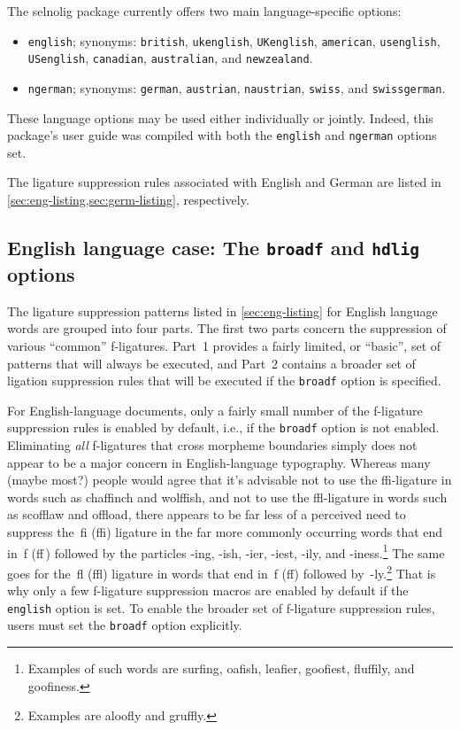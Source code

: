 \documentclass[11pt]{article}
\newcommand{\pkg}[1]{\textsf{#1}}
\newcommand{\opt}[1]{\texttt{#1}}
\begin{document}
The \pkg{selnolig} package currently offers two main language-specific options: 
\begin{itemize}
\item \opt{english}; synonyms: \opt{british}, \opt{ukenglish}, \opt{UKenglish}, \opt{amer\-ican}, \opt{usenglish}, \opt{USenglish}, \opt{cana\-dian}, \opt{australian}, and \opt{new\-zealand}.
\item \opt{ngerman}; synonyms: \opt{german}, \opt{austrian}, \opt{naustrian}, \opt{swiss}, and \opt{swiss\-german}.
\end{itemize}
These language options may be used either individually or jointly. Indeed, this package's user guide was compiled with both the \opt{english} and \opt{ngerman} options set.

The ligature suppression rules associated with English and German are listed in \cref{sec:eng-listing,sec:germ-listing}, respectively.



\subsection[English language case: The broadf and hdlig options]{English language case: The \opt{broadf} and \opt{hdlig} options} \label{sec:eng-opt}

The ligature suppression patterns listed in \cref{sec:eng-listing} for English language words are grouped into four parts. The first two parts concern the suppression of various \enquote{common} f-ligatures. Part~1 provides a fairly limited, or \enquote{basic}, set of patterns that will always be executed, and Part~2 contains a broader set of ligation suppression rules that will be executed if the \opt{broadf} option is specified. 

For English-language documents, only a fairly small number of the f-ligature suppression rules is enabled by default, i.e., if the \opt{broadf} option is not enabled. Eliminating \emph{all} f-ligatures that cross morpheme boundaries simply does not appear to be a major concern in English-language typography. Whereas many (maybe most?) people would agree that it's advisable not to use the ffi-ligature in words such as chaffinch and wolffish, and not to use the ffl-ligature in words such as scofflaw and offload, there appears to be far less of a perceived need to suppress the~fi (ffi) ligature in the far more commonly occurring words that end in~f (ff\,) followed by the particles -ing, -ish, -ier, -iest, -ily, and -iness.\footnote{Examples of such words are sur\mbox{fi}ng, oa\mbox{fi}sh, lea\mbox{fi}er, goo\mbox{fi}est, flu\mbox{ffi}ly, and goo\mbox{fi}ness.} The same goes for the~fl (ffl) ligature in words that end in~f (ff) followed by~-ly.\footnote{Examples are \mbox{aloofly} and \mbox{gruffly}.} That is why only a few f-ligature suppression macros are enabled by default if the \opt{english} option is set. To enable the broader set of f-ligature suppression rules, users must set the \opt{broadf} option explicitly.
\end{document}
